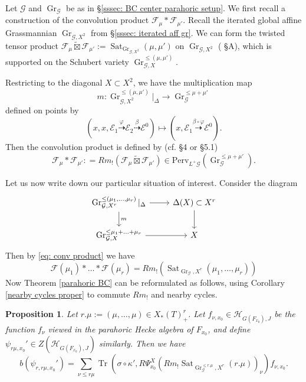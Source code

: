 \documentclass[reqno]{amsart}
\numberwithin{equation}{section}
\newcommand{\wt}[1]{\widetilde{#1}}
\newcommand{\Cal}[1]{\mathcal{#1}}
\newcommand{\co}{\colon}
\newcommand{\mrm}[1]{\mathrm{#1}}
\DeclareMathOperator{\Tr}{Tr}
\DeclareMathOperator{\Gr}{Gr}
\DeclareMathOperator{\Sat}{Sat}
\newtheorem{prop}[thm]{Proposition}
\theoremstyle{remark}
\numberwithin{equation}{section}
\begin{document}
Let $\Cal{G}$ and $\Gr_{\Cal{G}}$ be as in \S \ref{sssec: BC center parahoric setup}. We first recall a construction of the convolution product $\Cal{F}_{\mu} *\Cal{F}_{\mu'}$. Recall the iterated global affine Grassmannian $\Gr_{\Cal{G}, X^2}$ from \S \ref{sssec: iterated aff gr}. We can form the twisted tensor product $\Cal{F}_{\mu} \wt{\boxtimes} \Cal{F}_{\mu'}  := \Sat_{\Gr_{\Cal{G}, X^2}}(\mu, \mu')$ on $\Gr_{\Cal{G}, X^2}$ (\cite{Zhu15} \S A), which is supported on the Schubert variety $\Gr_{\Cal{G},X}^{\leq (\mu, \mu')}$.

Restricting to the diagonal $X \subset X^2$, we have the multiplication map 
 \[
m \co \Gr_{\Cal{G},X^2}^{\leq (\mu, \mu')}|_{\Delta} \rightarrow \Gr_{\Cal{G}}^{\leq \mu+\mu'}
 \]
 defined on points by  
 \[
 (x,x,\Cal{E}_1 \stackrel{\varphi}\dashrightarrow \Cal{E}_2  \stackrel{\beta}\dashrightarrow\Cal{E}^0) \mapsto (x,\Cal{E}_1 \stackrel{\beta  \circ \varphi} \dashrightarrow \Cal{E}^0).
 \]
 Then the convolution product is defined by (cf. \cite{MV07} \S 4 or \cite{Zhu15} \S 5.1) 
 \begin{equation}\label{eq: conv product}
	 \Cal{F}_{\mu} *\Cal{F}_{\mu'} : = Rm_! (\Cal{F}_{\mu} \wt{\boxtimes} \Cal{F}_{\mu'} ) \in \mrm{Perv}_{L^+ \Cal{G}}(\Gr_{\Cal{G}}^{\leq \mu+ \mu'}).
 \end{equation}
 
Let us now write down our particular situation of interest. Consider the diagram
\[
\begin{tikzcd} 
\Gr_{\Cal{G}, X^r}^{\leq (\mu_1, \ldots, \mu_r)}|_{\Delta} \ar[r] \ar[d,  "m"]	 &  \Delta(X) \subset X^r  \ar[d] \\
\Gr_{\Cal{G}, X}^{\leq \mu_1 + \ldots + \mu_r} \ar[r]  & X 
\end{tikzcd}
\]
Then by \eqref{eq: conv product} we have
\[
\Cal{F}(\mu_1) *  \ldots  * \Cal{F}(\mu_r) = Rm_!(\Sat_{\Gr_{\Cal{G}}, X^r}(\mu_1, \ldots, \mu_r)) 
\] 
Now Theorem \ref{parahoric BC} can be reformulated as follows, using Corollary \ref{nearby cycles proper} to commute $Rm_!$ and nearby cycles. 

\begin{prop}\label{base change formula}
Let $r.\mu := (\mu, \ldots, \mu) \in X_*(T)_+^r$. Let $f_{\nu,x_0} \in \Cal{H}_{G(F_{x_0}),J}$ be the function $f_{\nu}$ viewed in the parahoric Hecke algebra of $F_{x_0}$, and define $\psi_{r\mu,x_0}' \in Z(\Cal{H}_{G(F_{x_0}),J})$ similarly. Then we have
\[
b(\psi_{r,r\mu,x_0}') = \sum_{\nu \leq r \mu} \Tr(\sigma \circ \kappa', R\Psi^{X}_{x_0} (Rm_! \Sat_{\Gr_{\Cal{G}}^{\leq r.\mu}, X^r}(r.\mu))_{\nu}) f_{\nu,x_0}.
\]
\end{prop}
\end{document}
